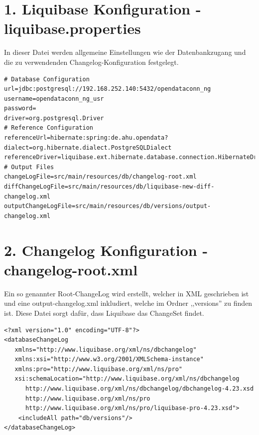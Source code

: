 \documentclass[a4paper,12pt]{scrreprt}
\begin{document}
\section*{\small \textbf{1. Liquibase Konfiguration - liquibase.properties}}
In dieser Datei werden allgemeine Einstellungen wie der Datenbankzugang und die zu verwendenden Changelog-Konfiguration festgelegt.
\begin{lstlisting}[language=properties]
# Database Configuration
url=jdbc:postgresql://192.168.252.140:5432/opendataconn_ng
username=opendataconn_ng_usr
password=
driver=org.postgresql.Driver
# Reference Configuration
referenceUrl=hibernate:spring:de.ahu.opendata?dialect=org.hibernate.dialect.PostgreSQLDialect
referenceDriver=liquibase.ext.hibernate.database.connection.HibernateDriver
# Output Files
changeLogFile=src/main/resources/db/changelog-root.xml
diffChangeLogFile=src/main/resources/db/liquibase-new-diff-changelog.xml
outputChangeLogFile=src/main/resources/db/versions/output-changelog.xml
\end{lstlisting}
\section*{\small \textbf{2. Changelog Konfiguration - changelog-root.xml}}
Ein so genannter Root-ChangeLog wird erstellt, welcher in XML geschrieben ist und eine output-changelog.xml inkludiert, welche im Ordner ,,versions'' zu finden ist. Diese Datei sorgt dafür, dass Liquibase das ChangeSet findet.
\begin{lstlisting}
<?xml version="1.0" encoding="UTF-8"?>   
<databaseChangeLog
   xmlns="http://www.liquibase.org/xml/ns/dbchangelog"
   xmlns:xsi="http://www.w3.org/2001/XMLSchema-instance"
   xmlns:pro="http://www.liquibase.org/xml/ns/pro"
   xsi:schemaLocation="http://www.liquibase.org/xml/ns/dbchangelog
      http://www.liquibase.org/xml/ns/dbchangelog/dbchangelog-4.23.xsd
      http://www.liquibase.org/xml/ns/pro 
      http://www.liquibase.org/xml/ns/pro/liquibase-pro-4.23.xsd">  
    <includeAll path="db/versions"/>  
</databaseChangeLog>
\end{lstlisting}
\end{document}
